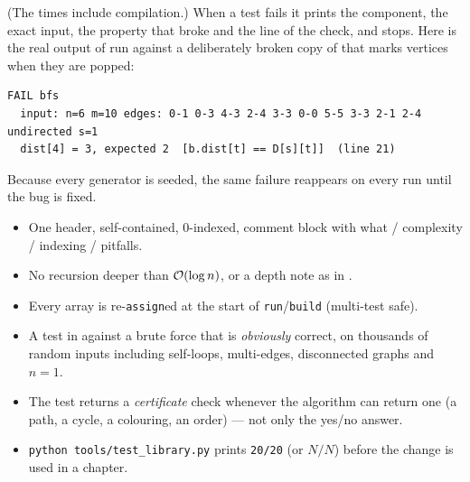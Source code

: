 (The times include compilation.) When a test fails it prints the component, the exact input, the property that broke and the line of the check, and stops. Here is the real output of  run against a deliberately broken copy of  that marks vertices when they are popped:

\begin{lstlisting}[style=trace]
FAIL bfs
  input: n=6 m=10 edges: 0-1 0-3 4-3 2-4 3-3 0-0 5-5 3-3 2-1 2-4 undirected s=1
  dist[4] = 3, expected 2  [b.dist[t] == D[s][t]]  (line 21)
\end{lstlisting}

Because every generator is seeded, the same failure reappears on every run until the bug is fixed.

\begin{checklistbox}
\begin{itemize}[leftmargin=*]
    \item One header, self-contained, 0-indexed, comment block with what / complexity / indexing / pitfalls.
    \item No recursion deeper than $\mathcal{O}(\log n)$, or a depth note as in .
    \item Every array is re-\texttt{assign}ed at the start of \texttt{run}/\texttt{build} (multi-test safe).
    \item A test in  against a brute force that is \emph{obviously} correct, on thousands of random inputs including self-loops, multi-edges, disconnected graphs and $n=1$.
    \item The test returns a \emph{certificate} check whenever the algorithm can return one (a path, a cycle, a colouring, an order) --- not only the yes/no answer.
    \item \texttt{python tools/test\_library.py} prints \texttt{20/20} (or $N/N$) before the change is used in a chapter.
\end{itemize}
\end{checklistbox}
